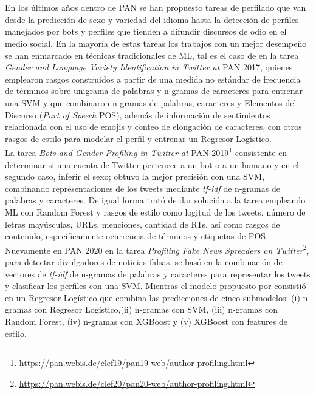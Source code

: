  \\
 \\
 En los últimos años dentro de PAN se han propuesto tareas de perfilado que van desde la predicción de sexo y variedad del idioma  hasta la detección de perfiles manejados por bots y perfiles que tienden a difundir discursos de odio en el medio social. En la mayoría de estas tareas los trabajos con un mejor desempeño se han enmarcado en técnicas tradicionales de ML, tal es el caso de \citep{basile:2017} en la tarea \textit{Gender and Language Variety Identification in Twitter at} PAN 2017, quienes emplearon rasgos construidos a partir de una medida no estándar de frecuencia de términos sobre unigrama de palabras y n-gramas de caracteres para entrenar una SVM y \citep{martinc:2017}  que combinaron n-gramas de palabras, caracteres y Elementos del Discurso (\textit{Part of Speech} POS), además de información de sentimientos relacionada con el uso de emojis y conteo de elongación de caracteres, con otros rasgos de estilo para modelar el perfil y entrenar un Regresor Logístico. 
 \\
 La tarea \textit{Bots and Gender Profiling in Twitter at} PAN 2019\footnote{\url{https://pan.webis.de/clef19/pan19-web/author-profiling.html}} consistente en determinar si una cuenta de Twitter pertenece a un bot o a un humano y en el segundo caso, inferir el sexo; \citep{DBLP:conf/clef/Pizarro19} obtuvo la mejor precisión con una SVM, combinando representaciones de los tweets mediante \textit{tf-idf} de n-gramas de palabras y caracteres. De igual forma \citep{DBLP:conf/clef/Johansson19} trató de dar solución a la tarea empleando ML con Random Forest y rasgos de estilo como logitud de los tweets, número de letras mayúsculas, URLs, menciones, cantidad de RTs, así como rasgos de contenido, específicamente ocurrencia de términos y etiquetas de POS.
 \\ 
 Nuevamente en PAN 2020 en la tarea \textit{Profiling Fake News Spreaders on Twitter}\footnote{\url{https://pan.webis.de/clef20/pan20-web/author-profiling.html}}, para detectar divulgadores de noticias falsas, \citep{pizarro:2020} se basó en la combinación de vectores de \textit{tf-idf} de n-gramas de palabras y caracteres para representar los tweets y clasificar los perfiles con una SVM. Mientras el modelo propuesto por \citep{buda:2020} consistió en un Regresor Logístico que combina las predicciones de cinco submodelos: (i) n-gramas con Regresor Logístico,(ii) n-gramas con SVM, (iii) n-gramas con Random Forest, (iv) n-gramas con XGBoost y (v) XGBoost con features de estilo.
